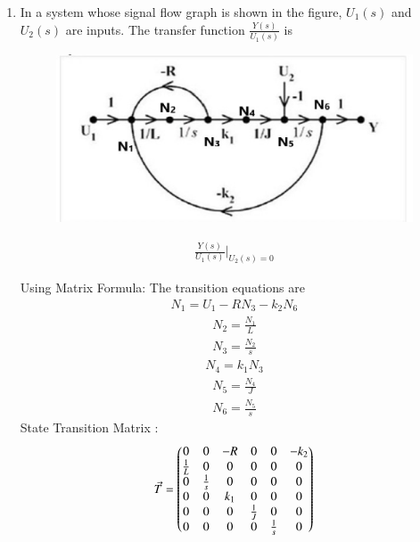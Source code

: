 \begin{enumerate}[label=\thesection.\arabic*.,ref=\thesection.\theenumi]
\item In a system whose signal flow graph is shown in the figure, $U_1(s)$ and $U_2(s)$ are inputs. The transfer function $\frac{Y(s)}{U_1(s)}$ is

\begin{figure}[!h]
  \includegraphics[width=\columnwidth]{picture1.eps}
\end{figure}







\solution 
\begin{align}
    \frac{Y(s)}{U_1(s)}\Biggr|_{U_2(s)=0}
\end{align}

Using Matrix Formula:
\newline
The transition equations are
\begin{align}
    N_1 = U_1-RN_3-k_2N_6  
\end{align}
\begin{align}
    N_2=\frac{N_1}{L}
\end{align}
\begin{align}
    N_3=\frac{N_2}{s}
\end{align}
\begin{align}
    N_4=k_1N_3
\end{align}
\begin{align}
    N_5=\frac{N_4}{J}
\end{align}
\begin{align}
    N_6=\frac{N_5}{s}
\end{align}
State Transition Matrix :
\begin{align}
    \Vec{T} = \begin{pmatrix}0 & 0 & -R & 0 & 0 & -k_2\\
    \frac{1}{L} & 0 & 0 & 0 & 0 & 0\\
    0 & \frac{1}{s} & 0 & 0 & 0 & 0\\
    0 & 0 & k_1 & 0 & 0 & 0\\
    0 & 0 & 0 & \frac{1}{J} & 0 & 0\\
    0 & 0 & 0 & 0 & \frac{1}{s} & 0\end{pmatrix}
\end{align}    


\end{enumerate}
